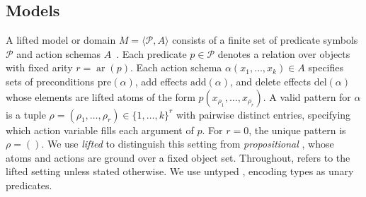 
\subsection{\strips Models}

A lifted \strips model or domain $M=\langle\mathcal{P},A\rangle$ consists of a finite set of predicate symbols $\mathcal{P}$ and action schemas
$A$~\citep{russell:book,ghallab:book,geffner:book}. Each predicate
$p\in\mathcal{P}$ denotes a relation over objects with fixed arity
$r=\operatorname{ar}(p)$. Each action schema $\alpha(x_1,\ldots,x_k)\in A$ specifies sets of preconditions $\mathrm{pre}(\alpha)$, add effects $\mathrm{add}(\alpha)$, and delete effects $\mathrm{del}(\alpha)$ whose elements are lifted atoms of the form $p(x_{\rho_1},\ldots,x_{\rho_r})$.
A valid pattern for $\alpha$ is a tuple
$\rho=(\rho_1,\ldots,\rho_r)\in\{1,\ldots,k\}^r$
with pairwise distinct entries, specifying which action variable fills each argument of $p$. For $r=0$, the unique pattern is $\rho=()$.
We use \emph{lifted} to distinguish this setting from
\textit{propositional} \strips, whose atoms and actions are ground over a fixed object set. %
Throughout, \strips refers to the lifted setting unless stated otherwise. We use untyped \strips, encoding types as unary predicates.


